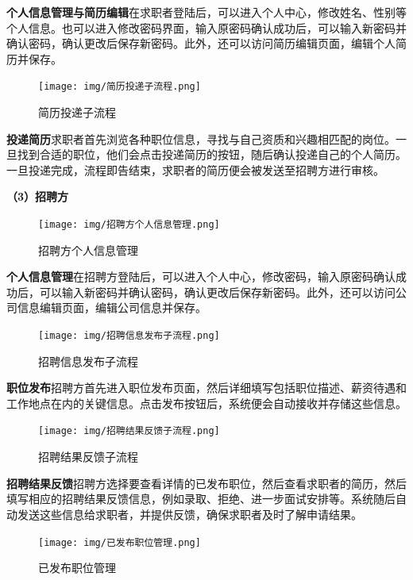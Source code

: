\documentclass[UTF8,a4paper,10pt]{ctexart}
\begin{document}
\textbf{个人信息管理与简历编辑}\space 在求职者登陆后，可以进入个人中心，修改姓名、性别等个人信息。也可以进入修改密码界面，输入原密码确认成功后，可以输入新密码并确认密码，确认更改后保存新密码。此外，还可以访问简历编辑页面，编辑个人简历并保存。
\begin{figure}[H]
    \centering
    \texttt{[image: img/简历投递子流程.png]}
    \caption{简历投递子流程}
    \label{fig:简历投递子流程}
\end{figure}

\textbf{投递简历}\space 求职者首先浏览各种职位信息，寻找与自己资质和兴趣相匹配的岗位。一旦找到合适的职位，他们会点击投递简历的按钮，随后确认投递自己的个人简历。一旦投递完成，流程即告结束，求职者的简历便会被发送至招聘方进行审核。

\textbf{（3）招聘方} \\
\begin{figure}[H]
    \centering
    \texttt{[image: img/招聘方个人信息管理.png]}
    \caption{招聘方个人信息管理}
    \label{fig:招聘方个人信息管理}
\end{figure}

\textbf{个人信息管理}\space 在招聘方登陆后，可以进入个人中心，修改密码，输入原密码确认成功后，可以输入新密码并确认密码，确认更改后保存新密码。此外，还可以访问公司信息编辑页面，编辑公司信息并保存。

\begin{figure}[H]
    \centering
    \texttt{[image: img/招聘信息发布子流程.png]}
    \caption{招聘信息发布子流程}
    \label{fig:招聘信息发布子流程}
\end{figure}

\textbf{职位发布}\space 招聘方首先进入职位发布页面，然后详细填写包括职位描述、薪资待遇和工作地点在内的关键信息。点击发布按钮后，系统便会自动接收并存储这些信息。

\begin{figure}[H]
    \centering
    \texttt{[image: img/招聘结果反馈子流程.png]}
    \caption{招聘结果反馈子流程}
    \label{fig:招聘结果反馈子流程}
\end{figure}

\textbf{招聘结果反馈}\space 招聘方选择要查看详情的已发布职位，然后查看求职者的简历，然后填写相应的招聘结果反馈信息，例如录取、拒绝、进一步面试安排等。系统随后自动发送这些信息给求职者，并提供反馈，确保求职者及时了解申请结果。

\begin{figure}[H]
    \centering
    \texttt{[image: img/已发布职位管理.png]}
    \caption{已发布职位管理}
    \label{fig:已发布职位管理}
\end{figure}
\end{document}

